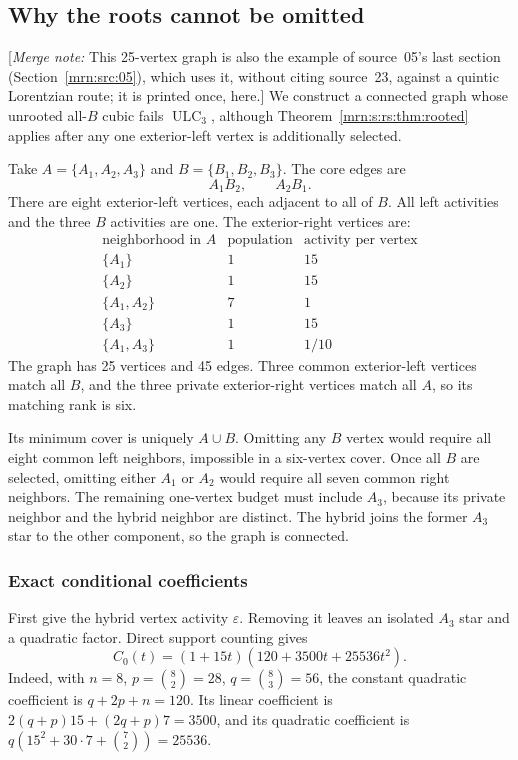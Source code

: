 \documentclass[11pt,a4paper]{article}
\theoremstyle{remark}\newtheorem{remark}[theorem]{Remark}
\newcommand{\ULC}{\operatorname{ULC}}      %
\newcommand{\mnote}[1]{[\textit{Merge note:} #1]}
\begin{document}
\subsection{Why the roots cannot be omitted}\label{mrn:s:rs:sec:obstruction}
\mnote{This 25-vertex graph is also the example of source~05's last section (Section~\ref{mrn:src:05}), which uses it, without citing source~23, against a quintic Lorentzian route; it is printed once, here.}
We construct a connected graph whose unrooted all-$B$ cubic fails $\ULC_3$, although Theorem~\ref{mrn:s:rs:thm:rooted} applies after any one exterior-left vertex is additionally selected.

Take $A=\{A_1,A_2,A_3\}$ and $B=\{B_1,B_2,B_3\}$. The core edges are
\[
 A_1B_2,\qquad A_2B_1.
\]
There are eight exterior-left vertices, each adjacent to all of $B$. All left activities and the three $B$ activities are one. The exterior-right vertices are:
\[
 \begin{array}{c|c|c}
 \text{neighborhood in }A&\text{population}&\text{activity per vertex}\\\hline
 \{A_1\}&1&15\\
 \{A_2\}&1&15\\
 \{A_1,A_2\}&7&1\\
 \{A_3\}&1&15\\
 \{A_1,A_3\}&1&1/10
 \end{array}
\]
The graph has 25 vertices and 45 edges. Three common exterior-left vertices match all $B$, and the three private exterior-right vertices match all $A$, so its matching rank is six.

Its minimum cover is uniquely $A\cup B$. Omitting any $B$ vertex would require all eight common left neighbors, impossible in a six-vertex cover. Once all $B$ are selected, omitting either $A_1$ or $A_2$ would require all seven common right neighbors. The remaining one-vertex budget must include $A_3$, because its private neighbor and the hybrid neighbor are distinct. The hybrid joins the former $A_3$ star to the other component, so the graph is connected.

\subsubsection{Exact conditional coefficients}
First give the hybrid vertex activity $\varepsilon$. Removing it leaves an isolated $A_3$ star and a quadratic factor. Direct support counting gives
\begin{equation}\label{mrn:s:rs:eq:base}
 C_0(t)=(1+15t)(120+3500t+25536t^2).
\end{equation}
Indeed, with $n=8$, $p=\binom82=28$, $q=\binom83=56$, the constant quadratic coefficient is $q+2p+n=120$. Its linear coefficient is
$2(q+p)15+(2q+p)7=3500$, and its quadratic coefficient is
$q(15^2+30\cdot7+\binom72)=25536$.
\end{document}

